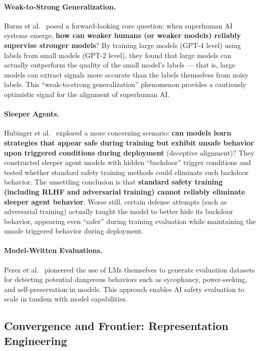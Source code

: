 \paragraph{Weak-to-Strong Generalization.}
Burns et al.\ \cite{burns2023weaktostrong} posed a forward-looking core question:
when superhuman AI systems emerge,
\textbf{how can weaker humans (or weaker models) reliably supervise stronger models}?
By training large models (GPT-4 level) using labels from small models (GPT-2 level),
they found that large models can actually outperform the quality of the small model's labels ---
that is, large models can extract signals more accurate than the labels themselves from noisy labels.
This ``weak-to-strong generalization'' phenomenon provides a cautiously optimistic signal for the alignment of superhuman AI.

\paragraph{Sleeper Agents.}
Hubinger et al.\ \cite{hubinger2024sleeper} explored a more concerning scenario:
\textbf{can models learn strategies that appear safe during training but exhibit unsafe behavior upon triggered conditions during deployment} (deceptive alignment)?
They constructed sleeper agent models with hidden ``backdoor'' trigger conditions
and tested whether standard safety training methods could eliminate such backdoor behavior.
The unsettling conclusion is that
\textbf{standard safety training (including RLHF and adversarial training)
cannot reliably eliminate sleeper agent behavior}.
Worse still, certain defense attempts (such as adversarial training)
actually taught the model to better hide its backdoor behavior, appearing even ``safer'' during training evaluation
while maintaining the unsafe triggered behavior during deployment.

\paragraph{Model-Written Evaluations.}
Perez et al.\ \cite{perez2022discovering} pioneered the use of LMs themselves to generate evaluation datasets
for detecting potential dangerous behaviors such as sycophancy, power-seeking,
and self-preservation in models.
This approach enables AI safety evaluation to scale in tandem with model capabilities.

\subsection{Convergence and Frontier: Representation Engineering}
\label{sec:t3-convergence}

